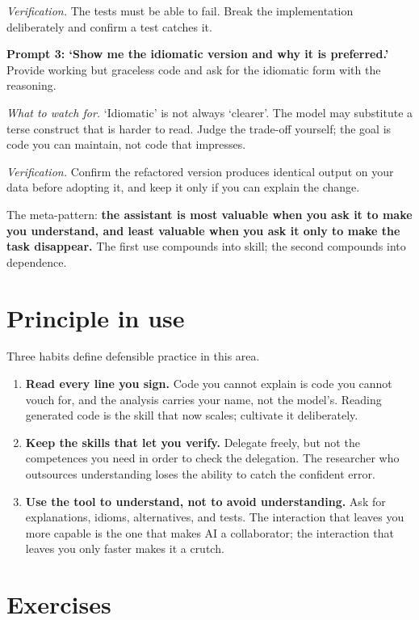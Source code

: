 \documentclass[
  letterpaper,
  11pt]{scrbook}
\begin{document}
\emph{Verification.} The tests must be able to fail. Break the
implementation deliberately and confirm a test catches it.

\textbf{Prompt 3: `Show me the idiomatic version and why it is
preferred.'} Provide working but graceless code and ask for the
idiomatic form with the reasoning.

\emph{What to watch for.} `Idiomatic' is not always `clearer'. The model
may substitute a terse construct that is harder to read. Judge the
trade-off yourself; the goal is code you can maintain, not code that
impresses.

\emph{Verification.} Confirm the refactored version produces identical
output on your data before adopting it, and keep it only if you can
explain the change.

The meta-pattern: \textbf{the assistant is most valuable when you ask it
to make you understand, and least valuable when you ask it only to make
the task disappear.} The first use compounds into skill; the second
compounds into dependence.

\section{Principle in use}\label{principle-in-use-3}

Three habits define defensible practice in this area.

\begin{enumerate}
\def\labelenumi{\arabic{enumi}.}
\item
  \textbf{Read every line you sign.} Code you cannot explain is code you
  cannot vouch for, and the analysis carries your name, not the model's.
  Reading generated code is the skill that now scales; cultivate it
  deliberately.
\item
  \textbf{Keep the skills that let you verify.} Delegate freely, but not
  the competences you need in order to check the delegation. The
  researcher who outsources understanding loses the ability to catch the
  confident error.
\item
  \textbf{Use the tool to understand, not to avoid understanding.} Ask
  for explanations, idioms, alternatives, and tests. The interaction
  that leaves you more capable is the one that makes AI a collaborator;
  the interaction that leaves you only faster makes it a crutch.
\end{enumerate}

\section{Exercises}\label{exercises-3}
\end{document}
